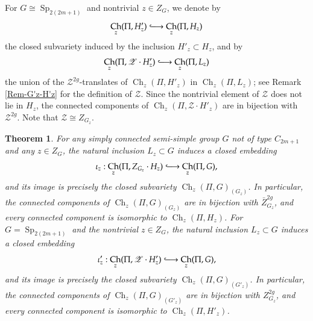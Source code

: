 \documentclass[11pt,oneside,dvipsnames]{amsart}
\theoremstyle{plain}
\newtheorem{Thm}{Theorem}
\theoremstyle{definition}
\theoremstyle{named}
\DeclareMathOperator{\Ch}{Ch}
\DeclareMathOperator{\Sp}{Sp}
\newcommand{\hooklongrightarrow}{\lhook\joinrel\longrightarrow}
\begin{document}
For $G\cong\Sp_{2(2m+1)}$ and nontrivial $z\in Z_G$, we denote by 
$$
\Ch_z(\Pi,H'_z)\hooklongrightarrow\Ch_z(\Pi,H_z)
$$
the closed subvariety induced by the inclusion $H'_z\subset H_z$, and by
$$
\Ch_z(\Pi,\mathscr{Z}\cdot H'_z)\hooklongrightarrow\Ch_z(\Pi,L_z)
$$
the union of the $\mathscr{Z}^{2g}$-translates of $\Ch_z(\Pi,H'_z)$ in $\Ch_z(\Pi,L_z)$; see Remark \ref{Rem-G'z-H'z} for the definition of $\mathscr{Z}$. Since the nontrivial element of $\mathscr{Z}$ does not lie in $H_z$, the connected components of $\Ch_z(\Pi,\mathscr{Z}\cdot H'_z)$ are in bijection with $\mathscr{Z}^{2g}$. Note that $\mathscr{Z}\cong Z_{G_z}$.
 
\begin{Thm}\label{Thm-sing-loci=Ch-A}
For any simply connected semi-simple group $G$ not of type $C_{2m+1}$ and any $z\in Z_G$, the natural inclusion $L_z\subset G$ induces a closed embedding
$$
\iota_z:\Ch_z(\Pi,Z_{G_z}\cdot H_z)\hooklongrightarrow\Ch_z(\Pi,G),
$$
and its image is precisely the closed subvariety $\Ch_z(\Pi,G)_{(G_z)}$. In particular, the connected components of $\Ch_z(\Pi,G)_{(G_z)}$ are in bijection with $\bar{Z}_{G_z}^{2g}$, and every connected component is isomorphic to $\Ch_z(\Pi,H_z)$. For $G=\Sp_{2(2m+1)}$ and the nontrivial $z\in Z_G$, the natural inclusion $L_z\subset G$ induces a closed embedding
$$
\iota'_z:\Ch_z(\Pi,\mathscr{Z}\cdot H'_z)\hooklongrightarrow\Ch_z(\Pi,G),
$$
and its image is precisely the closed subvariety $\Ch_z(\Pi,G)_{(G'_z)}$. In particular, the connected components of $\Ch_z(\Pi,G)_{(G'_z)}$ are in bijection with $Z_{G_z}^{2g}$, and every connected component is isomorphic to $\Ch_z(\Pi,H'_z)$.
\end{Thm}
\end{document}
